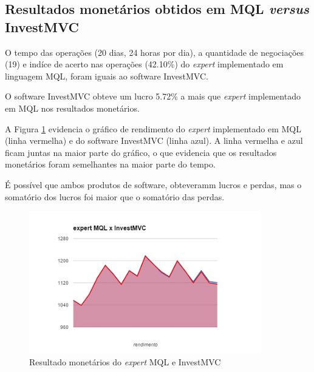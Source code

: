 \subsection{Resultados monetários obtidos em MQL \textit{versus} InvestMVC}
O tempo das operações (20 dias, 24 horas por dia), a quantidade de negociações (19) e indíce de acerto nas operações (42.10\%) do \textit{expert} implementado em linguagem MQL, foram iguais ao software InvestMVC.

O software InvestMVC obteve um lucro 5.72\% a mais que \textit{expert} implementado em MQL nos resultados monetários. 

A Figura \ref{rendimentoVersus} evidencia o gráfico de rendimento do \textit{expert} implementado em MQL (linha vermelha) e do software InvestMVC (linha azul). A linha vermelha e azul ficam juntas na maior parte do gráfico, o que evidencia que os resultados monetários foram semelhantes na maior parte do tempo.

É possível que ambos produtos de software, obteveramm lucros e perdas, mas o somatório dos lucros foi maior que o somatório das perdas.

\begin{figure}[H]
\centering
\includegraphics[width=0.9\textwidth]{figuras/rendimentoVersus}
\caption{Resultado monetários do \textit{expert} MQL e InvestMVC}
\label{rendimentoVersus}
\end{figure}